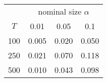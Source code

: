 % 
\begin{tabular}{cccc}
  \hline
  & \multicolumn{3}{c}{nominal size $\alpha$} \\
 $T$ & 0.01 & 0.05 & 0.1 \\
 \hline
100 & 0.005 & 0.020 & 0.050 \\ 
  250 & 0.021 & 0.070 & 0.118 \\ 
  500 & 0.010 & 0.043 & 0.098 \\ 
   \hline
\end{tabular}
